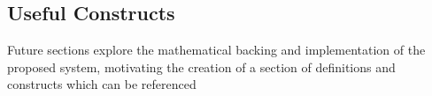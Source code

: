 \subsection{Useful Constructs}

Future sections explore the mathematical backing and implementation of the proposed system, motivating the creation of a section of definitions and constructs which can be referenced 
